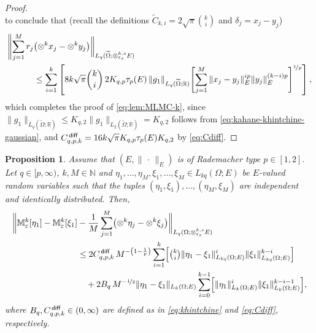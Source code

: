 \documentclass[reqno]{amsart}
\numberwithin{equation}{section}
\newcommand{\bbM}{\mathbb{M}}
\newcommand{\bbN}{\mathbb{N}}
\newcommand{\bbR}{\mathbb{R}}
\newcommand{\Omegat}{\widetilde{\Omega}}
\newcommand{\xk}{\otimes^k}
\newcommand{\xkseps}{\otimes^{k,s}_{\varepsilon_s}}
\newcommand{\Mk}{\bbM^k_\varepsilon}
\newcommand{\norm}[2]{     \| #1       \|_{ #2 }}
\newcommand{\Cdiff}{C^{\,\sf diff}_{q,p,k}}
\newtheorem{proposition}[lemma]{Proposition}
\theoremstyle{remark}
\theoremstyle{definition}
\begin{document}
\begin{proof}
\[	\]
	to conclude that 
	(recall the definitions 
	$\widetilde{C}_{k,i} = 2 \sqrt{ \pi }  \binom{k}{i}$ 
	and 
	$\delta_j = x_j - y_j$) 
	\begin{align*} 
	\Biggl\|  
	\sum_{j=1}^M 
	r_j &\bigl( \xk x_j - \xk y_j \bigr) 
	\biggr\|_{L_q(\Omegat;\xkseps E)} 
	\\
	&\leq 
	\sum_{i=1}^k 
	\left[ 
	8 k \sqrt{\pi} \binom{k}{i} \, 
	2 K_{q,p} \tau_p(E) \, 
	\norm{g_1}{L_q(\Omegat;\bbR)} 
	\Biggl[ 
	\sum_{j=1}^M 
	\norm{ x_j - y_j }{E}^{ip} \norm{y_j}{E}^{(k-i)p} 
	\Biggr]^{\nicefrac{1}{p}}  
	\right], 
	\end{align*} 
	which completes the proof of \eqref{eq:lem:MLMC-k}, since 
	$\norm{g_1}{L_q(\Omegat;\bbR)} 
	\leq 
	K_{q,2} \norm{g_1}{L_2(\Omegat;\bbR)}  
	= 
	K_{q,2}$ 
	follows from \eqref{eq:kahane-khintchine-gaussian}, 
	and 
	$\Cdiff 
	= 
	16 k \sqrt{\pi} K_{q,p} \tau_{p}(E) K_{q,2}$ 
	by \eqref{eq:Cdiff}. 
\end{proof}


\begin{proposition}\label{prop:MLMC-k} 
	Assume that  
	$(E,\norm{\,\cdot\,}{E})$ 
	is of Rademacher type $p\in[1,2]$. 
	Let $q\in[p,\infty)$, $k,M\in\bbN$  
	and $\eta_1, \ldots, \eta_M, \xi_1,\ldots,\xi_M\in L_{kq}(\Omega;E)$ be 
	$E$-valued random variables 
	such that the tuples
	$(\eta_1,\xi_1),\ldots,(\eta_M,\xi_M)$ 
	are independent and identically distributed. 
	Then, 
	\begin{align*} 
	\biggl\| 
	\Mk[\eta_1] 
	-
	\Mk[\xi_1] 
	&-
	\frac{1}{M} 
	\sum_{j=1}^M 
	\bigl( 
	\xk \eta_j 
	- 
	\xk \xi_j 
	\bigr) 
	\biggr\|_{L_q(\Omega;\xkseps E)} 
	\\
	&\leq 
	2 \Cdiff \,  
	M^{-\left( 1-\frac{1}{p} \right)} 
	\sum_{i=1}^k 
	\Bigl[ 
	{\textstyle\binom{k}{i}} 
	\norm{ \eta_1 - \xi_1 }{L_{kq}(\Omega;E)}^i 
	\norm{ \xi_1 }{L_{kq}(\Omega;E)}^{k-i} 
	\Bigr] 
	\\
	&\quad + 
	2 B_q \, 
	M^{-\nicefrac{1}{2}} 
	\norm{ \eta_1 - \xi_1 }{L_k(\Omega;E)} 
	\sum_{i=0}^{k-1} 
	\Bigl[ 
	\norm{ \eta_1 }{L_k(\Omega;E)}^i 
	\norm{ \xi_1 }{L_k(\Omega;E)}^{k-i-1} 
	\Bigr] 
	, 
	\end{align*} 
	where $B_q, \Cdiff\in(0,\infty)$ 
	are defined as in \eqref{eq:khintchine} 
	and \eqref{eq:Cdiff}, respectively. 
\end{proposition} 
\end{document}
